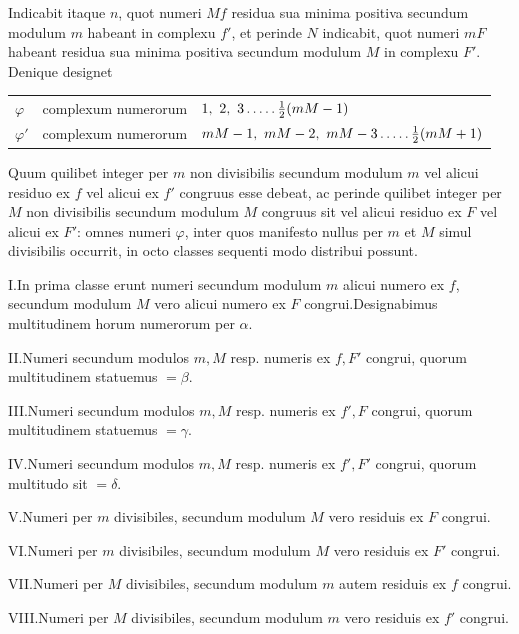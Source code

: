 Indicabit itaque $n$, quot numeri $Mf$ residua sua minima positiva secundum modulum $m$ habeant in complexu $f'$, et perinde $N$ indicabit, quot numeri $mF$ habeant residua sua minima positiva secundum modulum $M$ in complexu $F'$. Denique designet

{\small
\begin{center}\setlength{\tabcolsep}{3pt}
\begin{tabular}{@{}lll@{}}
$\varphi$ & complexum numerorum & $1,\ 2,\ 3\dotsfive\frac12(mM-1)$ \\
$\varphi'$ & complexum numerorum & $mM-1,\ mM-2,\ mM-3\dotsfive\frac12(mM+1)$
\end{tabular}\end{center}
}

Quum quilibet integer per $m$ non divisibilis secundum modulum $m$ vel alicui residuo ex $f$ vel alicui ex $f'$ congruus esse debeat, ac perinde quilibet integer per $M$ non divisibilis secundum modulum $M$ congruus sit vel alicui residuo ex $F$ vel alicui ex $F'$: omnes numeri $\varphi$, inter quos manifesto nullus per $m$ et $M$ simul divisibilis occurrit, in octo classes sequenti modo distribui possunt.

I.\quad In prima classe erunt numeri secundum modulum $m$ alicui numero ex $f$, secundum modulum $M$ vero alicui numero ex $F$ congrui.\quad Designabimus multitudinem horum numerorum per $\alpha$.

%
II.\quad Numeri secundum modulos $m,M$ resp. numeris ex $f,F'$ congrui, quorum multitudinem statuemus $=\beta$.

III.\quad Numeri secundum modulos $m,M$ resp. numeris ex $f',F$ congrui, quorum multitudinem statuemus $=\gamma$.

IV.\quad Numeri secundum modulos $m,M$ resp. numeris ex $f',F'$ congrui, quorum multitudo sit $=\delta$.

V.\quad Numeri per $m$ divisibiles, secundum modulum $M$ vero residuis ex $F$ congrui.

VI.\quad Numeri per $m$ divisibiles, secundum modulum $M$ vero residuis ex $F'$ congrui.

VII.\quad Numeri per $M$ divisibiles, secundum modulum $m$ autem residuis ex $f$ congrui.

VIII.\quad Numeri per $M$ divisibiles, secundum modulum $m$ vero residuis ex $f'$ congrui.


